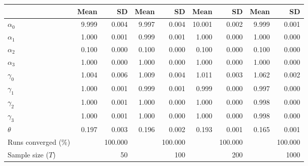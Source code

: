 
\begin{tabular}[t]{lrrrrrrrr}
\toprule
  & Mean & SD & Mean  & SD  & Mean   & SD   & Mean    & SD   \\
\midrule
$\alpha_{0}$ & 9.999 & 0.004 & 9.997 & 0.004 & 10.001 & 0.002 & 9.999 & 0.001\\
$\alpha_{1}$ & 1.000 & 0.001 & 0.999 & 0.001 & 1.000 & 0.000 & 1.000 & 0.000\\
$\alpha_{2}$ & 0.100 & 0.000 & 0.100 & 0.000 & 0.100 & 0.000 & 0.100 & 0.000\\
$\alpha_{3}$ & 1.000 & 0.000 & 1.000 & 0.000 & 1.000 & 0.000 & 1.000 & 0.000\\
$\gamma_{0}$ & 1.004 & 0.006 & 1.009 & 0.004 & 1.011 & 0.003 & 1.062 & 0.002\\
$\gamma_{1}$ & 1.000 & 0.001 & 0.999 & 0.001 & 0.999 & 0.000 & 0.997 & 0.000\\
$\gamma_{2}$ & 1.000 & 0.001 & 1.000 & 0.000 & 1.000 & 0.000 & 0.998 & 0.000\\
$\gamma_{3}$ & 1.000 & 0.001 & 1.000 & 0.000 & 1.000 & 0.000 & 0.998 & 0.000\\
$\theta$ & 0.197 & 0.003 & 0.196 & 0.002 & 0.193 & 0.001 & 0.165 & 0.001\\
Runs converged (\%) &  & 100.000 &  & 100.000 &  & 100.000 &  & 100.000\\
Sample size ($T$) &  & 50 &  & 100 &  & 200 &  & 1000\\
\bottomrule
\end{tabular}
